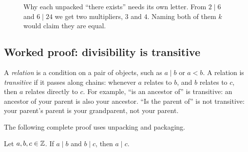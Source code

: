 \begin{figure}[htbp]
\centering
{}
\caption{Why each unpacked ``there exists'' needs its own letter. From $2 \mid 6$ and $6 \mid 24$ we get two multipliers, $3$ and $4$. Naming both of them $k$ would claim they are equal.}
\label{06:fig-variable-collision}
\end{figure}

\subsection{Worked proof: divisibility is transitive}

A \emph{relation} is a condition on a pair of objects, such as $a \mid b$ or $a < b$. A relation is \emph{transitive} if it passes along chains: whenever $a$ relates to $b$, and $b$ relates to $c$, then $a$ relates directly to $c$. For example, ``is an ancestor of'' is transitive: an ancestor of your parent is also your ancestor. ``Is the parent of'' is not transitive: your parent's parent is your grandparent, not your parent.

The following complete proof uses unpacking and packaging.

\begin{theorem}\label{06:thm-divisibility-transitive}
Let $a, b, c \in \mathbb{Z}$. If $a \mid b$ and $b \mid c$, then $a \mid c$.
\end{theorem}

